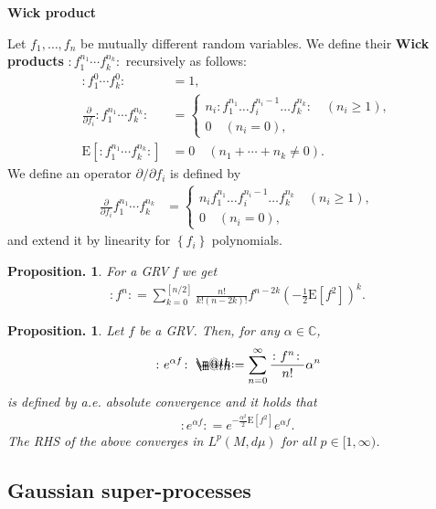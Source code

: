\documentclass[openany, a4paper, oneside]{jsbook}
\makeatletter
\newcommand*{\defeq}{\mathrel{\rlap{%
\raisebox{0.3ex}{$\m@th\cdot$}}%
\raisebox{-0.3ex}{$\m@th\cdot$}}%
=}
\theoremstyle{break}
\newtheorem{prop}[thm]{Proposition.}
\theoremstyle{breakdefn}
\newcommand{\rbk}[1]{\left (#1\right)}
\newcommand{\sqbk}[1]{\left[#1\right]}
\newcommand{\cbk}[1]{\left\{#1\right\}}
\newcommand{\bbC}{\mathbb{C}}
\newcommand{\E}[1]{\rmE\sqbk{#1}}
\newcommand{\rmE}{\mathrm{E}}
\newcommand{\wick}[1]{\colon #1 \colon}
\makeatother
\begin{document}
\vspace{1em}

\textbf{Wick product}

Let $f_1, \dots, f_n$ be mutually different random variables.
We define their \textbf{Wick products} $\wick{f_1^{n_1} \cdots f_k^{n_k}}$ recursively as follows:
\begin{align}
 \wick{f_1^{0} \cdots f_k^{0}}
 &= 1, \\
 \frac{\partial}{\partial f_i} \wick{f_1^{n_1} \cdots f_k^{n_k}}
 &=
 \begin{cases}
  n_i \wick{f_1^{n_1} \dots f_i^{n_i - 1} \dots f_k^{n_k}} \quad (n_i \geq 1), \\
  0 \quad (n_i = 0),
 \end{cases} \\
 \E{ \wick{f_1^{n_1} \cdots f_k^{n_k}} }
 &= 0 \quad (n_1 + \cdots + n_k \neq 0).
\end{align}
We define an operator $\partial / \partial f_i$ is defined by
\begin{align}
 \frac{\partial}{\partial f_i} f_1^{n_1} \cdots f_k^{n_k}
 &=
 \begin{cases}
  n_i  f_1^{n_1} \dots f_i^{n_i - 1} \dots f_k^{n_k} \quad (n_i \geq 1), \\
  0 \quad (n_i = 0),
 \end{cases}
\end{align}
and extend it by linearity for $\cbk{f_i}$ polynomials.

\begin{prop}
 For a GRV f we get
 \begin{align}
  \wick{f^n}
  =
  \sum_{k=0}^{\sqbk{n/2}} \frac{n!}{k! (n-2k)!} f^{n - 2k} \rbk{- \frac{1}{2} \E{f^2}}^k.
 \end{align}
\end{prop}
\begin{prop}
 Let $f$ be a GRV.
 Then, for any $\alpha \in \bbC$,
 \begin{align}
  \wick{e^{\alpha f}}
  \defeq
  \sum_{n=0}^{\infty} \frac{\wick{f^n}}{n!} \alpha^n
 \end{align}
 is defined by a.e. absolute convergence and it holds that
 \begin{align}
  \wick{e^{\alpha f}}
  =
  e^{- \frac{\alpha^2}{2} \E{f^2}} e^{\alpha f}.
 \end{align}
 The RHS of the above converges in $L^p (M, d \mu)$ for all $p \in [1, \infty)$.
\end{prop}
\subsection{Gaussian super-processes}
\end{document}
